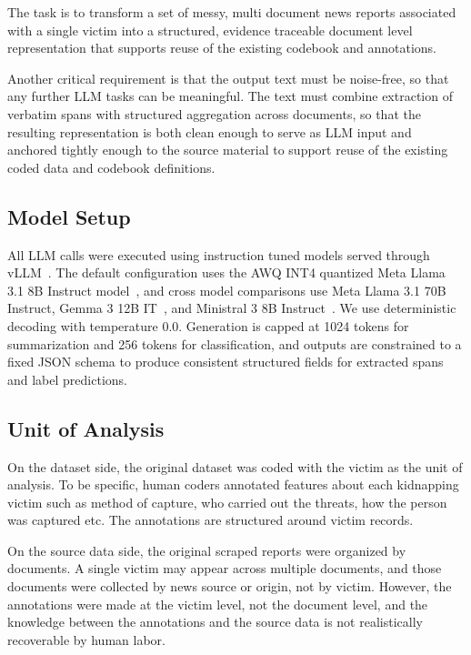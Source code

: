 \documentclass{article}
\begin{document}
The task is to transform a set of messy, multi document
news reports associated with a single victim into a structured, evidence
traceable document level representation that supports reuse of the
existing codebook and annotations.

Another critical requirement is that the output text must be noise-free,
so that any further LLM tasks can be meaningful. The text must combine
extraction of verbatim spans with structured aggregation across
documents, so that the resulting representation is both clean enough to
serve as LLM input and anchored tightly enough to the source material to
support reuse of the existing coded data and codebook definitions.


\subsection{Model Setup}\label{model-setup}

All LLM calls were executed using instruction tuned models served through vLLM~\cite{Kwon_etal2023}. The default configuration uses the AWQ INT4 quantized Meta Llama 3.1 8B Instruct model~\cite{Dubey_etal2024}, and cross model comparisons use Meta Llama 3.1 70B Instruct, Gemma 3 12B IT~\cite{GemmaTeam2025}, and Ministral 3 8B Instruct~\cite{MistralAI2026}. We use deterministic decoding with temperature 0.0. Generation is capped at 1024 tokens for summarization and 256 tokens for classification, and outputs are constrained to a fixed JSON schema to produce consistent structured fields for extracted spans and label predictions.

\subsection{Unit of Analysis}\label{unit-of-analysis}

On the dataset side, the original dataset was coded with the victim as the unit of analysis. To be specific, human coders annotated features about each kidnapping victim such as method of capture, who carried out the threats, how the person was captured etc. The annotations are structured around victim records.

On the source data side, the original scraped reports were organized by documents. A single victim may appear across multiple documents, and those documents were collected by news source or origin, not by victim. However, the annotations were made at the victim level, not the document level, and the knowledge between the annotations and the source data is not realistically recoverable by human labor.
\end{document}
